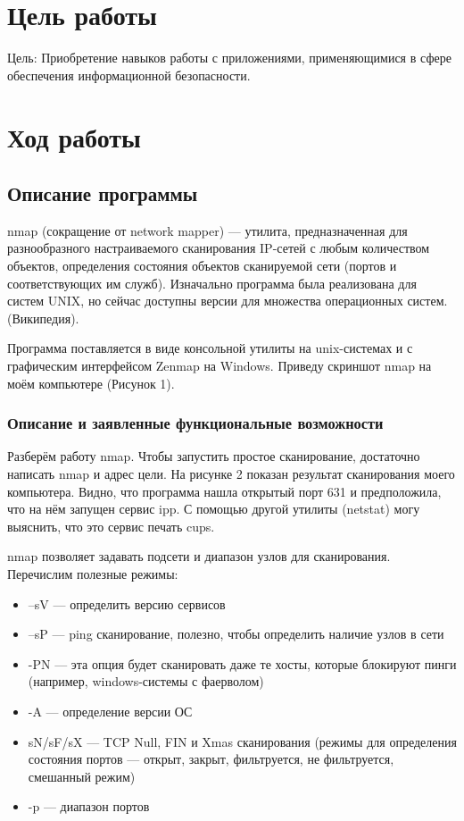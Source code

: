 \section{Цель работы}
Цель: Приобретение навыков работы с приложениями, применяющимися в сфере обеспечения информационной безопасности.

\section{Ход работы}

\subsection{Описание программы}
nmap (сокращение от network mapper) — утилита, предназначенная для разнообразного настраиваемого сканирования IP-сетей с любым количеством объектов, определения состояния объектов сканируемой сети (портов и соответствующих им служб). Изначально программа была реализована для систем UNIX, но сейчас доступны версии для множества операционных систем. (Википедия).

Программа поставляется в виде консольной утилиты на unix-системах и с графическим интерфейсом Zenmap на Windows. Приведу скриншот nmap на моём компьютере (Рисунок 1).

\FloatBarrier

\subsubsection{Описание и заявленные функциональные возможности}
Разберём работу nmap. Чтобы запустить простое сканирование, достаточно написать nmap и адрес цели. На рисунке 2 показан результат сканирования моего компьютера. Видно, что программа нашла открытый порт 631 и предположила, что на нём запущен сервис ipp. С помощью другой утилиты (netstat) могу выяснить, что это сервис печать cups.
\FloatBarrier

nmap позволяет задавать подсети и диапазон узлов для сканирования. 
Перечислим полезные режимы:
\begin{itemize}
    \item –sV — определить версию сервисов
    \item –sP — ping сканирование, полезно, чтобы определить наличие узлов в сети
    \item -PN — эта опция будет сканировать даже те хосты, которые блокируют пинги (например, windows-системы с фаерволом)
    \item -A — определение версии ОС
    \item sN/sF/sX — TCP Null, FIN и Xmas сканирования (режимы для определения состояния портов — открыт, закрыт, фильтруется, не фильтруется, смешанный режим)
    \item -p — диапазон портов
\end{itemize}

